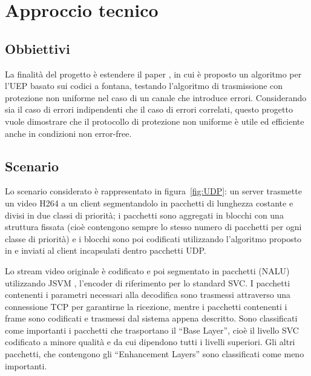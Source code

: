\documentclass[italian, a4paper, 12pt]{article}
\begin{document}
\section{Approccio tecnico}
\subsection{Obbiettivi} %
La finalità del progetto è estendere il paper \cite{uep}, in cui è proposto un algoritmo per l'UEP basato sui codici a fontana, testando l'algoritmo di trasmissione con protezione non uniforme nel caso di un canale che introduce errori.
%
Considerando sia il caso di errori indipendenti che il caso di errori correlati, questo progetto vuole dimostrare che il protocollo di protezione non uniforme è utile ed efficiente anche in condizioni non error-free.
\subsection{Scenario} %
Lo scenario considerato è rappresentato in figura~\ref{fig:UDP}: un
server trasmette un video H264 a un client segmentandolo in pacchetti
di lunghezza costante e divisi in due classi di priorità; i pacchetti
sono aggregati in blocchi con una struttura fissata (cioè contengono
sempre lo stesso numero di pacchetti per ogni classe di priorità) e i
blocchi sono poi codificati utilizzando l'algoritmo proposto in
\cite{uep} e inviati al client incapsulati dentro pacchetti UDP.

Lo stream video originale è codificato e poi segmentato in pacchetti
(NALU) utilizzando JSVM \cite{jsvm}, l'encoder di riferimento per lo
standard SVC. I pacchetti contenenti i parametri necessari alla
decodifica sono trasmessi attraverso una connessione TCP per
garantirne la ricezione, mentre i pacchetti contenenti i frame sono
codificati e trasmessi dal sistema appena descritto.
%
Sono classificati come importanti i pacchetti che trasportano il
``Base Layer'', cioè il livello SVC codificato a minore qualità e da
cui dipendono tutti i livelli superiori. Gli altri pacchetti, che
contengono gli ``Enhancement Layers'' sono classificati come meno
importanti.
\end{document}
